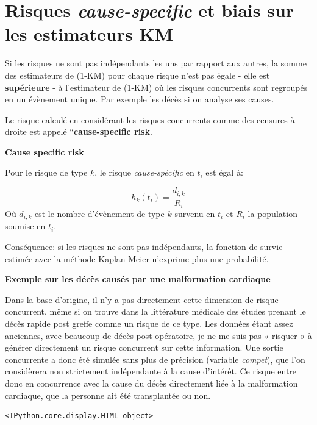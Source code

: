 \documentclass[
  12pt,
  letterpaper,
  DIV=11,
  numbers=noendperiod,
  onepage,
  openany]{scrreprt}
\begin{document}
\hypertarget{risques-cause-specific-et-biais-sur-les-estimateurs-km}{%
\section{\texorpdfstring{Risques \emph{cause-specific} et biais sur les
estimateurs
KM}{Risques cause-specific et biais sur les estimateurs KM}}\label{risques-cause-specific-et-biais-sur-les-estimateurs-km}}

Si les risques ne sont pas indépendants les uns par rapport aux autres,
la somme des estimateurs de (1-KM) pour chaque risque n'est pas égale -
elle est \textbf{supérieure} - à l'estimateur de (1-KM) où les risques
concurrents sont regroupés en un évènement unique. Par exemple les décès
si on analyse ses causes.

Le risque calculé en considérant les risques concurrents comme des
censures à droite est appelé ``\textbf{cause-specific risk}.

\textbf{Cause specific risk}

Pour le risque de type \(k\), le risque \emph{cause-spécific} en \(t_i\)
est égal à:

\[h_k(t_i)=\frac{d_{i,k}}{R_i}\] Où \(d_{i,k}\) est le nombre
d'évènement de type \(k\) survenu en \(t_i\) et \(R_i\) la population
soumise en \(t_i\).

Conséquence: si les risques ne sont pas indépendants, la fonction de
survie estimée avec la méthode Kaplan Meier n'exprime plus une
probabilité.

\textbf{Exemple sur les décès causés par une malformation cardiaque}

Dans la base d'origine, il n'y a pas directement cette dimension de
risque concurrent, même si on trouve dans la littérature médicale des
études prenant le décès rapide post greffe comme un risque de ce type.
Les données étant assez anciennes, avec beaucoup de décès
post-opératoire, je ne me suis pas « risquer » à générer directement un
risque concurrent sur cette information. Une sortie concurrente a donc
été simulée sans plus de précision (variable \emph{compet}), que l'on
considèrera non strictement indépendante à la cause d'intérêt. Ce risque
entre donc en concurrence avec la cause du décès directement liée à la
malformation cardiaque, que la personne ait été transplantée ou non.

\begin{verbatim}
<IPython.core.display.HTML object>
\end{verbatim}
\end{document}
